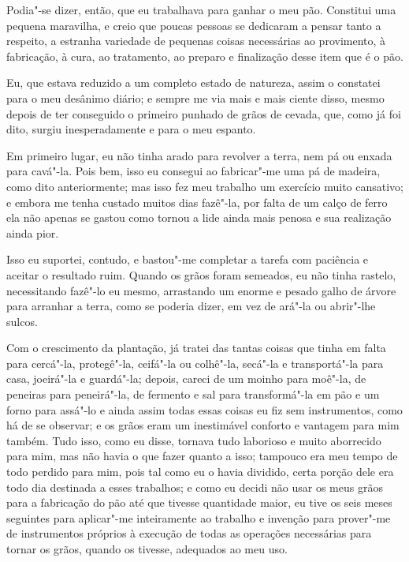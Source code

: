 Podia"-se dizer, então, que eu trabalhava para ganhar o meu pão.
Constitui uma pequena maravilha, e creio que poucas pessoas se dedicaram
a pensar tanto a respeito, a estranha variedade de pequenas coisas
necessárias ao provimento, à fabricação, à cura, ao tratamento, ao
preparo e finalização desse item que é o pão.

Eu, que estava reduzido a um completo estado de natureza, assim o
constatei para o meu desânimo diário; e sempre me via mais e mais ciente
disso, mesmo depois de ter conseguido o primeiro punhado de grãos de
cevada, que, como já foi dito, surgiu inesperadamente e para o meu
espanto.

Em primeiro lugar, eu não tinha arado para revolver a terra, nem pá ou
enxada para cavá"-la. Pois bem, isso eu consegui ao fabricar"-me uma pá de
madeira, como dito anteriormente; mas isso fez meu trabalho um exercício
muito cansativo; e embora me tenha custado muitos dias fazê"-la, por
falta de um calço de ferro ela não apenas se gastou como tornou a lide
ainda mais penosa e sua realização ainda pior.

Isso eu suportei, contudo, e bastou"-me completar a tarefa com paciência
e aceitar o resultado ruim. Quando os grãos foram semeados, eu não tinha
rastelo, necessitando fazê"-lo eu mesmo, arrastando um enorme e pesado
galho de árvore para arranhar a terra, como se poderia dizer, em vez de
ará"-la ou abrir"-lhe sulcos.

Com o crescimento da plantação, já tratei das tantas coisas que tinha em
falta para cercá"-la, protegê"-la, ceifá"-la ou colhê"-la, secá"-la e
transportá"-la para casa, joeirá"-la e guardá"-la; depois, careci de um
moinho para moê"-la, de peneiras para peneirá"-la, de fermento e sal para
transformá"-la em pão e um forno para assá"-lo e ainda assim todas essas
coisas eu fiz sem instrumentos, como há de se observar; e os grãos eram
um inestimável conforto e vantagem para mim também. Tudo isso, como eu
disse, tornava tudo laborioso e muito aborrecido para mim, mas não havia
o que fazer quanto a isso; tampouco era meu tempo de todo perdido para
mim, pois tal como eu o havia dividido, certa porção dele era todo dia
destinada a esses trabalhos; e como eu decidi não usar os meus grãos
para a fabricação do pão até que tivesse quantidade maior, eu tive os
seis meses seguintes para aplicar"-me inteiramente ao trabalho e invenção
para prover"-me de instrumentos próprios à execução de todas as operações
necessárias para tornar os grãos, quando os tivesse, adequados ao meu
uso.


